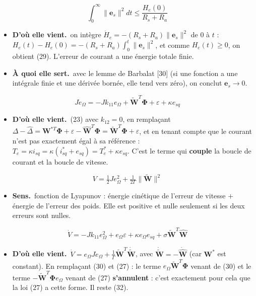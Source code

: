 \documentclass[11pt,a4paper]{article}
\newcommand{\bv}[1]{\mathbf{#1}}
\newenvironment{expl}{\begin{itemize}[leftmargin=1.2em,itemsep=2pt,topsep=2pt]}{\end{itemize}}
\newcommand{\sens}{\item \textbf{Sens.}~}
\newcommand{\origine}{\item \textbf{D'où elle vient.}~}
\newcommand{\role}{\item \textbf{À quoi elle sert.}~}
\begin{document}
\begin{equation}\tag{29}
\int_0^\infty\|\bv{e}_s\|^2dt\le\frac{H_e(0)}{R_s+R_a}
\end{equation}
\begin{expl}
\origine on intègre $\dot H_e=-(R_s+R_a)\|\bv e_s\|^2$ de 0 à $t$ : $H_e(t)-H_e(0)=-(R_s+R_a)\int_0^t\|\bv e_s\|^2$,
et comme $H_e(t)\ge0$, on obtient (29). L'erreur de courant a une \og énergie totale\fg{} finie.
\role avec le lemme de Barbalat [30] (si une fonction a une intégrale finie et une dérivée bornée, elle
tend vers zéro), on conclut $\bv e_s\to0$.
\end{expl}

\begin{equation}\tag{30}
J\dot e_\Omega=-Jk_{11}e_\Omega+\tilde{\bv{W}}^T\boldsymbol\Phi+\varepsilon+\kappa e_{sq}
\end{equation}
\begin{expl}
\origine (23) avec $k_{12}=0$, en remplaçant $\Delta-\hat\Delta=\bv W^{*T}\boldsymbol\Phi+\varepsilon-\hat{\bv W}^T\boldsymbol\Phi
=\tilde{\bv W}^T\boldsymbol\Phi+\varepsilon$, et en tenant compte que le courant n'est pas exactement égal à
sa référence : $T_e=\kappa i_{sq}=\kappa(i_{sq}^*+e_{sq})=T_e^*+\kappa e_{sq}$. C'est le terme qui
\textbf{couple} la boucle de courant et la boucle de vitesse.
\end{expl}

\begin{equation}\tag{31}
V=\tfrac12Je_\Omega^2+\tfrac{1}{2\Gamma}\|\tilde{\bv{W}}\|^2
\end{equation}
\begin{expl}
\sens fonction de Lyapunov : \og énergie cinétique\fg{} de l'erreur de vitesse $+$ \og énergie\fg{} de l'erreur
des poids. Elle est positive et nulle seulement si les deux erreurs sont nulles.
\end{expl}

\begin{equation}\tag{32}
\dot V=-Jk_{11}e_\Omega^2+e_\Omega\varepsilon+\kappa e_\Omega e_{sq}+\sigma\tilde{\bv{W}}^T\hat{\bv{W}}
\end{equation}
\begin{expl}
\origine $\dot V=e_\Omega J\dot e_\Omega+\frac1\Gamma\tilde{\bv W}^T\dot{\tilde{\bv W}}$, avec
$\dot{\tilde{\bv W}}=-\dot{\hat{\bv W}}$ (car $\bv W^*$ est constant). En remplaçant (30) et (27) :
le terme $e_\Omega\tilde{\bv W}^T\boldsymbol\Phi$ venant de (30) et le terme $-\tilde{\bv W}^T\boldsymbol\Phi e_\Omega$
venant de (27) \textbf{s'annulent} : c'est exactement pour cela que la loi (27) a cette forme. Il reste (32).
\end{expl}
\end{document}
